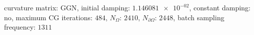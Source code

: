 curvature matrix: $\text{GGN}$, initial damping: $\num[scientific-notation=true]{1.146081e-02}$, constant damping: $\text{no}$, maximum CG iterations: $\num[scientific-notation=false]{484}$, $N_{\Omega}$: $\num[scientific-notation=false]{2410}$, $N_{\partial\Omega}$: $\num[scientific-notation=false]{2448}$, batch sampling frequency: $\num[scientific-notation=false]{1311}$
